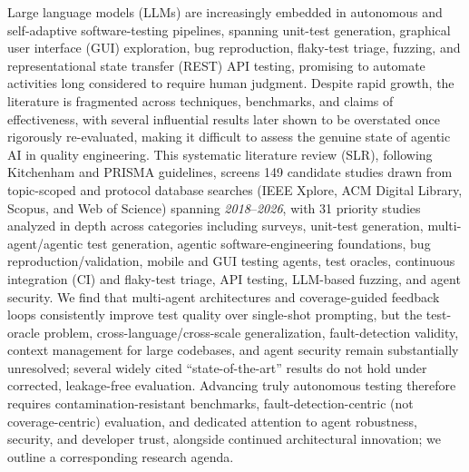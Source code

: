 %
Large language models (LLMs) are increasingly embedded in autonomous and
self-adaptive software-testing pipelines, spanning unit-test generation,
graphical user interface (GUI) exploration, bug reproduction, flaky-test triage,
fuzzing, and representational state transfer (REST) API testing, promising to
automate activities long considered to require human judgment. Despite rapid
growth, the literature is fragmented across techniques, benchmarks, and claims
of effectiveness, with several influential results later shown to be overstated
once rigorously re-evaluated, making it difficult to assess the genuine state
of agentic AI in quality engineering. This systematic literature review (SLR),
following Kitchenham and PRISMA guidelines, screens 149 candidate studies drawn
from topic-scoped and protocol database searches (IEEE Xplore, ACM Digital
Library, Scopus, and Web of Science) spanning \textit{2018}--\textit{2026}, with
31 priority studies analyzed in depth across categories including surveys,
unit-test generation, multi-agent/agentic test generation, agentic
software-engineering foundations, bug reproduction/validation, mobile and GUI
testing agents, test oracles, continuous integration (CI) and flaky-test triage,
API testing, LLM-based fuzzing, and agent security. We find that multi-agent
architectures and coverage-guided feedback loops consistently improve test
quality over single-shot prompting, but the test-oracle problem,
cross-language/cross-scale generalization, fault-detection validity, context
management for large codebases, and agent security remain substantially
unresolved; several widely cited ``state-of-the-art'' results do not hold under
corrected, leakage-free evaluation. Advancing truly autonomous testing
therefore requires contamination-resistant benchmarks, fault-detection-centric
(not coverage-centric) evaluation, and dedicated attention to agent robustness,
security, and developer trust, alongside continued architectural innovation;
we outline a corresponding research agenda.
